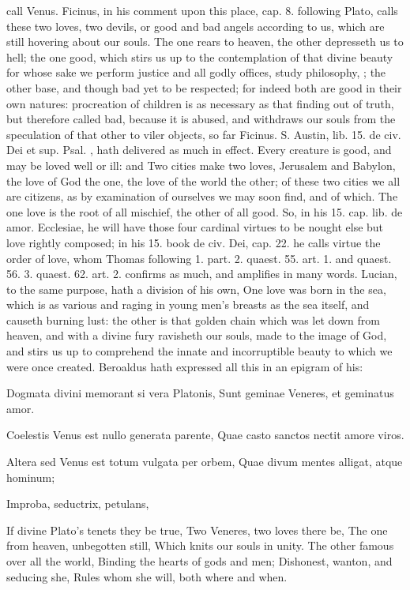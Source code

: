 {call Venus. Ficinus, in his comment upon this place, cap. 8. following
Plato, calls these two loves, two devils, or good and bad angels
according to us, which are still hovering about our souls. The
one rears to heaven, the other depresseth us to hell; the one good,
which stirs us up to the contemplation of that divine beauty for whose
sake we perform justice and all godly offices, study philosophy, \etc{};
the other base, and though bad yet to be respected; for indeed both are
good in their own natures: procreation of children is as necessary as
that finding out of truth, but therefore called bad, because it is
abused, and withdraws our souls from the speculation of that other to
viler objects, so far Ficinus. S. Austin, lib. 15. de civ. Dei et sup.
Psal. , hath delivered as much in effect. Every creature is
good, and may be loved well or ill: and Two cities make two
loves, Jerusalem and Babylon, the love of God the one, the love of the
world the other; of these two cities we all are citizens, as by
examination of ourselves we may soon find, and of which. The one love
is the root of all mischief, the other of all good. So, in his 15. cap.
lib. de amor. Ecclesiae, he will have those four cardinal virtues to be
nought else but love rightly composed; in his 15. book de civ. Dei,
cap. 22. he calls virtue the order of love, whom Thomas following 1.
part. 2. quaest. 55. art. 1. and quaest. 56. 3. quaest. 62. art. 2.
confirms as much, and amplifies in many words. Lucian, to the
same purpose, hath a division of his own, One love was born in the sea,
which is as various and raging in young men's breasts as the sea
itself, and causeth burning lust: the other is that golden chain which
was let down from heaven, and with a divine fury ravisheth our souls,
made to the image of God, and stirs us up to comprehend the innate and
incorruptible beauty to which we were once created. Beroaldus hath
expressed all this in an epigram of his:

Dogmata divini memorant si vera Platonis,
Sunt geminae Veneres, et geminatus amor.

Coelestis Venus est nullo generata parente,
Quae casto sanctos nectit amore viros.

Altera sed Venus est totum vulgata per orbem,
Quae divum mentes alligat, atque hominum;

Improba, seductrix, petulans, \etc{}

If divine Plato's tenets they be true,
Two Veneres, two loves there be,
The one from heaven, unbegotten still,
Which knits our souls in unity.
The other famous over all the world,
Binding the hearts of gods and men;
Dishonest, wanton, and seducing she,
Rules whom she will, both where and when.

}

